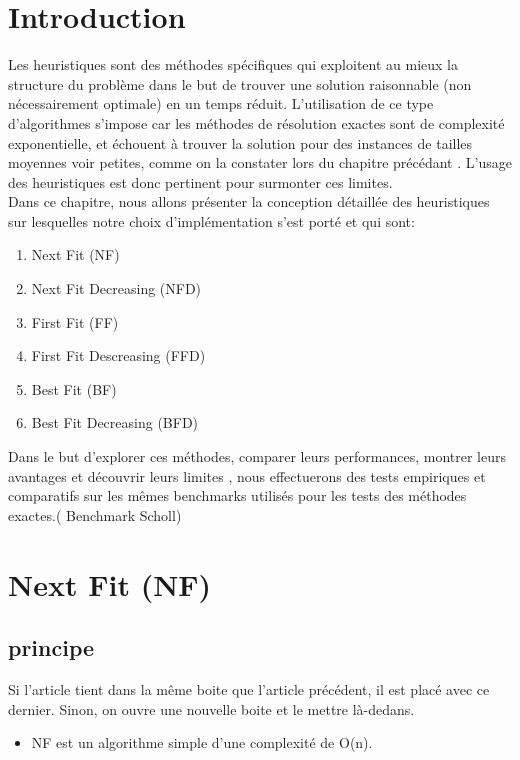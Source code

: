\documentclass[class=article, crop=false]{standalone}
\begin{document}
\section{Introduction}
Les heuristiques sont des méthodes spécifiques qui exploitent au mieux la structure du 
problème dans le but de trouver une solution raisonnable (non nécessairement optimale) en un temps réduit. 
L’utilisation de ce type d’algorithmes s'impose car les méthodes de résolution exactes sont 
de complexité exponentielle, et échouent à trouver la solution pour des instances de tailles moyennes voir petites,
 comme on la constater lors du chapitre précédant . 
L'usage des heuristiques est donc pertinent pour surmonter ces limites.\\

Dans ce chapitre, nous allons présenter la conception détaillée des heuristiques sur lesquelles notre choix d’implémentation s’est porté et qui sont:
\begin{enumerate}
    \item Next Fit (NF)
    \item Next Fit Decreasing (NFD)
    \item First Fit (FF)
    \item First Fit Descreasing (FFD)
    \item Best Fit (BF)
    \item Best Fit Decreasing (BFD)\\
\end{enumerate}

Dans le but d’explorer ces méthodes, comparer leurs performances, montrer leurs avantages et découvrir leurs limites , nous effectuerons des tests empiriques et comparatifs sur les mêmes  benchmarks utilisés pour les tests des méthodes exactes.( Benchmark Scholl)
\newpage
\section{Next Fit (NF)}
\subsection{principe}
Si l’article tient dans la même boite que l’article précédent, il est placé avec ce dernier. Sinon, on ouvre une nouvelle boite et le mettre là-dedans.
\begin{itemize}
    \item NF est un algorithme simple d’une complexité de O(n). 
\end{itemize}
\end{document}

